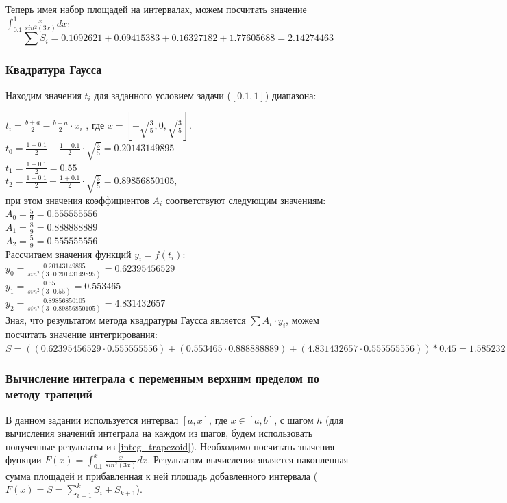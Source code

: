 \documentclass{article}
\begin{document}
Теперь имея набор площадей на интервалах, можем посчитать значение  
$\int_{0.1}^1 \frac{x}{sin^2(3x)}dx$:\\
\begin{displaymath} 
  \sum S_{i} = 0.1092621 + 0.09415383 + 0.16327182 + 1.77605688 = 2.14274463
\end{displaymath}

\subsubsection{Квадратура Гаусса}
Находим значения $t_{i}$ для заданного условием задачи ($[0.1, 1]$) диапазона:

$t_{i} = \frac{b + a}{2} - \frac{b - a}{2} \cdot x_{i}$ , где 
$x = [-\sqrt{\frac{3}{5}}, 0, \sqrt{\frac{3}{5}}]$.\\
$t_{0} = \frac{1 + 0.1}{2} - \frac{1 - 0.1}{2} \cdot \sqrt{\frac{3}{5}}
= 0.20143149895$ \\
$t_{1} = \frac{1 + 0.1}{2} = 0.55$  \\
$t_{2} = \frac{1 + 0.1}{2} + \frac{1 + 0.1}{2} \cdot \sqrt{\frac{3}{5}}
= 0.89856850105$, \\
при этом значения коэффициентов $A_{i}$ соответствуют следующим значениям: \\
$A_{0} = \frac{5}{9} = 0.555555556 $\\
$A_{1} = \frac{8}{9} = 0.888888889 $\\
$A_{2} = \frac{5}{9} = 0.555555556 $\\

Рассчитаем значения функций $y_{i} = f(t_{i})$: \\
$y_{0} = \frac{0.20143149895}{sin^2(3 \cdot 0.20143149895)} = 0.62395456529$\\
$y_{1} = \frac{0.55}{sin^2(3 \cdot 0.55)} = 0.553465$ \\
$y_{2} = \frac{0.89856850105}{sin^2(3 \cdot 0.89856850105)} = 4.831432657 $\\

Зная, что результатом метода квадратуры Гаусса является $\sum A_{i} \cdot
y_{i}$, можем посчитать значение интегрирования: \\

$S = ((0.62395456529 \cdot 0.555555556) 
   + (0.553465 \cdot 0.888888889) 
   + (4.831432657 \cdot 0.555555556)) * 0.45
   = 1.585232
$

\subsubsection{Вычисление интеграла с переменным верхним пределом по методу
трапеций}
В данном задании используется интервал $[a, x]$, где $x \in [a, b]$, с шагом
$h$ (для вычисления значений интеграла на каждом из шагов, будем использовать
полученные результаты из \ref{integ_trapezoid}). 
Необходимо посчитать значения функции $F(x) = \int_{0.1}^x
\frac{x}{sin^2(3x)}dx$. Результатом вычисления является накопленная сумма
площадей и прибавленная к ней площадь добавленного
интервала ($F(x) = S = \sum\limits_{i=1}^k S_i + S_{k+1}$).\\
\end{document}
